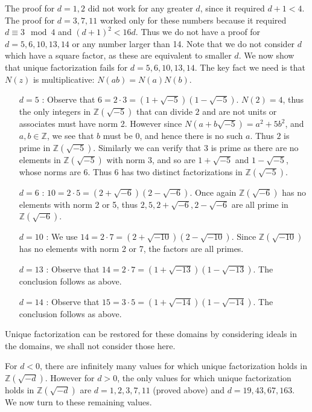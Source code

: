 \documentclass[12pt]{article}
\newcommand{\ints}{{\mathbb{Z}}}
\begin{document}
The proof for $d = 1, 2$ did not work for any greater $d$, since it required $d+1 < 4$. The proof for $d = 3, 7, 11$ worked only for these numbers because it required $d \equiv 3 \mod 4$ and $(d + 1)^2 < 16d$. Thus we do not have a proof for $d = 5, 6, 10, 13, 14$ or any number larger than 14.  Note that we do not consider $d$ which have a square factor, as these are equivalent to smaller $d$. We now show that unique factorization fails for $d = 5, 6, 10, 13, 14$. The key fact we need is that $N(z)$ is multiplicative: $N(ab) = N(a)N(b)$. 
\begin{itemize}
\item[$d = 5$]: Observe that $6 = 2 \cdot 3 = (1 + \sqrt{-5})(1 - \sqrt{-5})$.  $N(2) = 4$, thus the only integers in $\ints(\sqrt{-5})$ that can divide $2$ and are not units or associates must have norm 2. However since $N(a + b\sqrt{-5}) = a^2 + 5b^2$, and $a, b \in \ints$, we see that $b$ must be 0, and hence there is no such $a$. Thus $2$ is prime in $\ints(\sqrt{-5})$.  Similarly we can verify that $3$ is prime as there are no elements in $\ints(\sqrt{-5})$ with norm 3, and so are $1 + \sqrt{-5}$ and $1 - \sqrt{-5}$, whose norms are 6.  Thus $6$ has two distinct factorizations in $\ints(\sqrt{-5})$.
\item[$d = 6$]: $10 = 2\cdot 5 = (2 + \sqrt{-6})(2 - \sqrt{-6})$.  Once again $\ints(\sqrt{-6})$ has no elements with norm 2 or 5, thus $2, 5, 2 + \sqrt{-6}, 2 - \sqrt{-6}$ are all prime in $\ints(\sqrt{-6})$.
\item[$d = 10$]: We use $14 = 2\cdot 7 = (2 + \sqrt{-10})(2 - \sqrt{-10})$. Since $\ints(\sqrt{-10})$ has no elements with norm 2 or 7, the factors are all primes.
\item[$d = 13$]: Observe that $14 = 2\cdot 7 = (1 + \sqrt{-13})(1 - \sqrt{-13})$. The conclusion follows as above.
\item[$d = 14$]: Observe that $15 = 3\cdot 5 = (1 + \sqrt{-14})(1 - \sqrt{-14})$. The conclusion follows as above.
\end{itemize}
Unique factorization can be restored for these domains by considering ideals in the domains, we shall not consider those here.

For $d < 0$, there are infinitely many values for which unique factorization holds in $\ints(\sqrt{-d})$. However  for $d > 0$, the only values for which unique factorization holds in $\ints(\sqrt{-d})$ are $d = 1, 2, 3, 7, 11$ (proved above) and $d = 19, 43, 67, 163$. We now turn to these remaining values.
\end{document}
